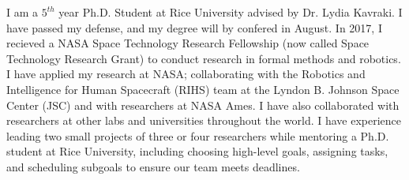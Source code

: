 
\small{I am a $5^{th}$ year Ph.D. Student at Rice University advised by Dr. Lydia Kavraki. I have passed my defense, and my degree will by confered in August. In 2017, I recieved a NASA Space Technology Research Fellowship (now called Space Technology Research Grant) to conduct research in formal methods and robotics. I have applied my research at NASA; collaborating with the Robotics and Intelligence for Human Spacecraft (RIHS) team at the Lyndon B. Johnson Space Center (JSC) and with researchers at NASA Ames. I have also collaborated with researchers at other labs and universities throughout the world. I have experience leading two small projects of three or four researchers while mentoring a Ph.D. student at Rice University, including choosing high-level goals, assigning tasks, and scheduling subgoals to ensure our team meets deadlines.}
